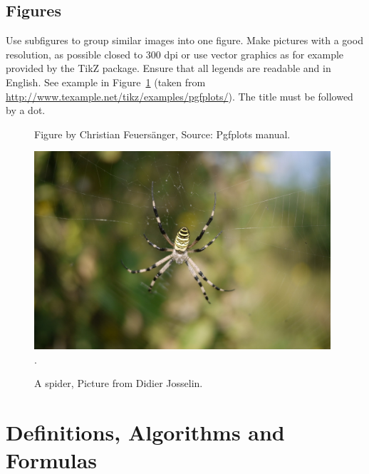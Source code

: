 \documentclass{jimis-final-en}
\begin{document}
\subsection{Figures}

Use subfigures to group similar images into one figure. Make pictures with a good resolution, as possible closed to 300 dpi or use vector graphics as for example provided by the TikZ package. Ensure that all legends are readable and in English. See example in Figure~\ref{fig:example} (taken from \url{http://www.texample.net/tikz/examples/pgfplots/}). The title must be followed by a dot.

\begin{figure}
  \centering
  \caption{Figure by Christian Feuers\"anger, Source: Pgfplots manual.}
  \label{fig:example}
\end{figure}

\begin{figure}[ht] 
\resizebox{10cm}{7cm}
  {\includegraphics[width=11cm]{Figures/spider.jpg}}
  \centering
  \label{frog}
.  \caption{A spider, Picture from Didier Josselin.}
  \end{figure}
  
\section{Definitions, Algorithms and Formulas}
\end{document}
